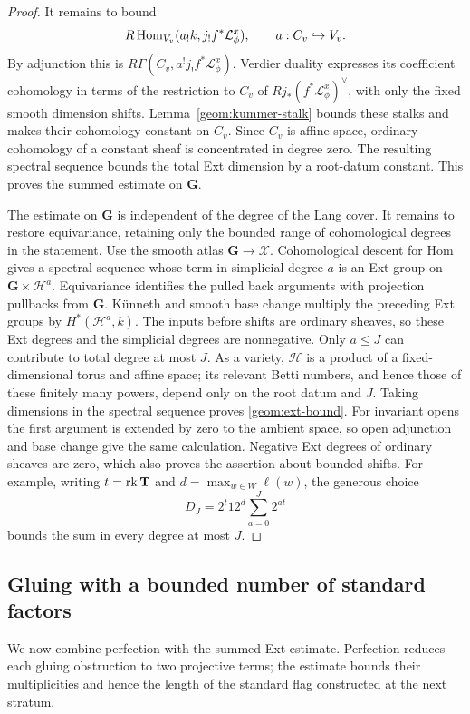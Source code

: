 \begin{proof}
It remains to bound
\[
 R\operatorname{Hom}_{V_v}(a_!k,j_!f^*\mathcal L^x_\phi),
 \qquad a:C_v\hookrightarrow V_v.
\]
By adjunction this is
\(R\Gamma(C_v,a^!j_!f^*\mathcal L^x_\phi)\).
Verdier duality expresses its coefficient cohomology in terms of the
restriction to \(C_v\) of
\(Rj_*(f^*\mathcal L^x_\phi)^{\vee}\), with only the fixed smooth
dimension shifts. Lemma~\ref{geom:kummer-stalk} bounds these stalks
and makes their cohomology constant on \(C_v\).
Since \(C_v\) is affine space, ordinary cohomology of a constant
sheaf is concentrated in degree zero. The resulting spectral sequence
bounds the total Ext dimension by a root-datum constant.
This proves the summed estimate on \(\mathbf G\).

The estimate on \(\mathbf G\) is independent of the degree of
the Lang cover.  It remains to restore equivariance, retaining
only the bounded range of cohomological degrees in the statement.
Use the smooth atlas \(\mathbf G\to\mathcal X\).
Cohomological descent for Hom gives a spectral sequence whose term
in simplicial degree \(a\) is an Ext group on
\(\mathbf G\times\mathcal H^a\). Equivariance identifies the pulled
back arguments with projection pullbacks from \(\mathbf G\).
K\"unneth and smooth base change multiply the preceding Ext groups
by \(H^*(\mathcal H^a,k)\). The inputs before shifts are ordinary
sheaves, so these Ext degrees and the simplicial degrees are
nonnegative. Only \(a\le J\) can contribute to total degree at most
\(J\). As a variety, \(\mathcal H\) is a product of a fixed-dimensional
torus and affine space; its relevant Betti numbers, and hence those of
these finitely many powers, depend only on the root datum and \(J\).
Taking dimensions in the spectral sequence proves
\eqref{geom:ext-bound}. For invariant opens the first argument is
extended by zero to the ambient space, so open adjunction and base
change give the same calculation. Negative Ext degrees of ordinary
sheaves are zero, which also proves the assertion about bounded shifts.
For example, writing \(t=\operatorname{rk}\mathbf T\) and
\(d=\max_{w\in W}\ell(w)\), the generous choice
\[
 D_J=2^t12^d\sum_{a=0}^J2^{at}
\]
bounds the sum in every degree at most \(J\).
\end{proof}

\subsection{Gluing with a bounded number of standard factors}

We now combine perfection with the summed Ext estimate.
Perfection reduces each gluing obstruction to two projective terms;
the estimate bounds their multiplicities and hence the length of
the standard flag constructed at the next stratum.

